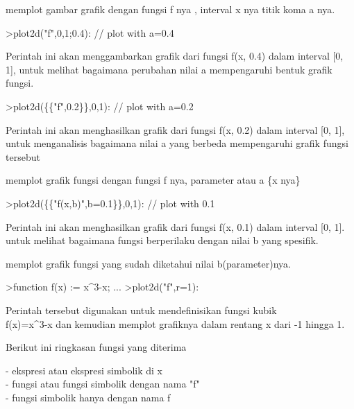 \documentclass{article}
\begin{document}
\begin{eulernotebook}
\begin{eulercomment}
\begin{eulercomment}
\begin{eulercomment}
\begin{eulercomment}
\begin{eulercomment}
\begin{eulercomment}
\begin{eulercomment}
memplot gambar grafik dengan fungsi f nya , interval x nya titik koma
a nya.
\end{eulercomment}
\begin{eulerprompt}
>plot2d("f",0,1;0.4): // plot with a=0.4
\end{eulerprompt}
\begin{eulercomment}
Perintah ini akan menggambarkan grafik dari fungsi f(x, 0.4) dalam
interval [0, 1], untuk melihat bagaimana perubahan nilai a
mempengaruhi bentuk grafik fungsi.
\end{eulercomment}
\begin{eulerprompt}
>plot2d(\{\{"f",0.2\}\},0,1): // plot with a=0.2
\end{eulerprompt}
\begin{eulercomment}
Perintah ini akan menghasilkan grafik dari fungsi f(x, 0.2) dalam
interval [0, 1], untuk menganalisis bagaimana nilai a yang berbeda
mempengaruhi grafik fungsi tersebut

memplot grafik fungsi dengan fungsi f nya, parameter atau a \{x nya\}
\end{eulercomment}
\begin{eulerprompt}
>plot2d(\{\{"f(x,b)",b=0.1\}\},0,1): // plot with 0.1
\end{eulerprompt}
\begin{eulercomment}
Perintah ini akan menghasilkan grafik dari fungsi f(x, 0.1) dalam
interval [0, 1]. untuk melihat bagaimana fungsi berperilaku dengan
nilai b yang spesifik.

memplot grafik fungsi yang sudah diketahui nilai b(parameter)nya.
\end{eulercomment}
\begin{eulerprompt}
>function f(x) := x^3-x; ...
>plot2d("f",r=1):
\end{eulerprompt}
\begin{eulercomment}
Perintah tersebut digunakan untuk mendefinisikan fungsi kubik\\
f(x)=x\textasciicircum{}3-x dan kemudian memplot grafiknya dalam rentang x dari -1
hingga 1.

Berikut ini ringkasan fungsi yang diterima

- ekspresi atau ekspresi simbolik di x\\
- fungsi atau fungsi simbolik dengan nama "f"\\
- fungsi simbolik hanya dengan nama f


\end{eulercomment}
\end{eulercomment}
\end{eulercomment}
\end{eulercomment}
\end{eulercomment}
\end{eulercomment}
\end{eulercomment}
\end{eulernotebook}
\end{document}

